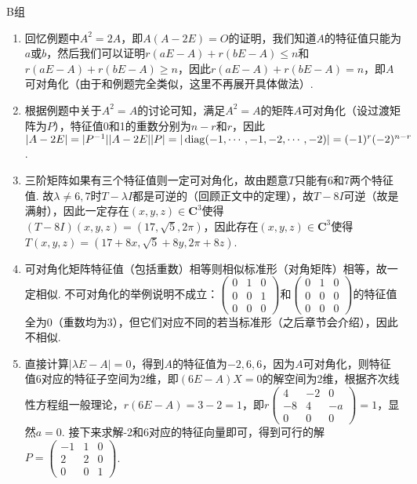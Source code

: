 \centerline{\heiti B组}
\begin{enumerate}
    \item 回忆例题中$A^2=2A$，即$A(A-2E)=O$的证明，我们知道$A$的特征值只能为$a$或$b$，然后我们可以证明$r(aE-A)+r(bE-A)\leqslant n$和$r(aE-A)+r(bE-A)\geqslant n$，因此$r(aE-A)+r(bE-A)=n$，即$A$可对角化（由于和例题完全类似，这里不再展开具体做法）.

    \item 根据例题中关于$A^2=A$的讨论可知，满足$A^2=A$的矩阵$A$可对角化（设过渡矩阵为$P$），特征值0和1的重数分别为$n-r$和$r$，因此$|A-2E|=|P^{-1}||A-2E||P|=|\operatorname{diag}(-1,\cdots,-1,-2,\cdots,-2)|=(-1)^r(-2)^{n-r}$.

    \item 三阶矩阵如果有三个特征值则一定可对角化，故由题意$T$只能有6和7两个特征值. 故$\lambda\neq 6,7$时$T-\lambda I$都是可逆的（回顾正文中的定理），故$T-8I$可逆（故是满射），因此一定存在$(x,y,z)\in\mathbf{C}^3$使得$(T-8I)(x,y,z)=(17,\sqrt{5},2\pi)$，因此存在$(x,y,z)\in\mathbf{C}^3$使得$T(x,y,z)=(17+8x,\sqrt{5}+8y,2\pi+8z)$.

    \item 可对角化矩阵特征值（包括重数）相等则相似标准形（对角矩阵）相等，故一定相似. 不可对角化的举例说明不成立：$\begin{pmatrix}
        0 & 1 & 0 \\ 0 & 0 & 1 \\ 0 & 0 & 0
    \end{pmatrix}$和$\begin{pmatrix}
        0 & 1 & 0 \\ 0 & 0 & 0 \\ 0 & 0 & 0
    \end{pmatrix}$的特征值全为0（重数均为3），但它们对应不同的若当标准形（之后章节会介绍），因此不相似.

    \item 直接计算$|\lambda E-A|=0$，得到$A$的特征值为$-2,6,6$，因为$A$可对角化，则特征值6对应的特征子空间为2维，即$(6E-A)X=0$的解空间为2维，根据齐次线性方程组一般理论，$r(6E-A)=3-2=1$，即$r\begin{pmatrix}
        4 & -2 & 0 \\ -8 & 4 & -a \\ 0 & 0 & 0
    \end{pmatrix}=1$，显然$a=0$. 接下来求解-2和6对应的特征向量即可，得到可行的解$P=\begin{pmatrix}
        -1 & 1 & 0 \\ 2 & 2 & 0 \\ 0 & 0 & 1
    \end{pmatrix}$.


\end{enumerate}
